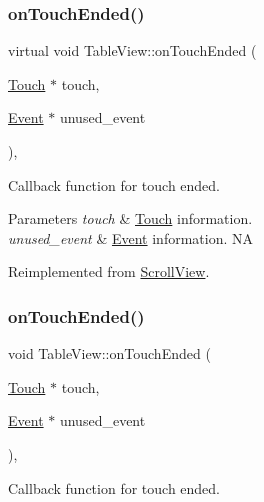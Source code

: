 \subsubsection{\texorpdfstring{on\+Touch\+Ended()}{onTouchEnded()}\hspace{0.1cm}{\footnotesize\ttfamily [1/2]}}
{\footnotesize\ttfamily virtual void Table\+View\+::on\+Touch\+Ended (\begin{DoxyParamCaption}\item[{\hyperlink{classTouch}{Touch} $\ast$}]{touch,  }\item[{\hyperlink{classEvent}{Event} $\ast$}]{unused\+\_\+event }\end{DoxyParamCaption})\hspace{0.3cm}{\ttfamily [override]}, {\ttfamily [virtual]}}

Callback function for touch ended.


\begin{DoxyParams}{Parameters}
{\em touch} & \hyperlink{classTouch}{Touch} information. \\
\hline
{\em unused\+\_\+event} & \hyperlink{classEvent}{Event} information.  NA \\
\hline
\end{DoxyParams}


Reimplemented from \hyperlink{classScrollView_a86f57715da926a475b75d67eff84701d}{Scroll\+View}.

\mbox{\label{classTableView_a0d96aaf8ac40256ed144565beaaf76aa}} 
\subsubsection{\texorpdfstring{on\+Touch\+Ended()}{onTouchEnded()}\hspace{0.1cm}{\footnotesize\ttfamily [2/2]}}
{\footnotesize\ttfamily void Table\+View\+::on\+Touch\+Ended (\begin{DoxyParamCaption}\item[{\hyperlink{classTouch}{Touch} $\ast$}]{touch,  }\item[{\hyperlink{classEvent}{Event} $\ast$}]{unused\+\_\+event }\end{DoxyParamCaption})\hspace{0.3cm}{\ttfamily [override]}, {\ttfamily [virtual]}}

Callback function for touch ended.


